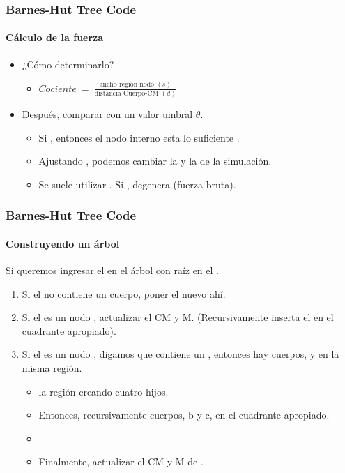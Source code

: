 \frame
{
\frametitle{Barnes-Hut Tree Code}
\framesubtitle{Cálculo de la fuerza}

\begin{itemize}
	\item ¿Cómo determinarlo?
	\begin{itemize}
		\item $ Cociente\ =\ \frac{\text{ancho región nodo }(s)}{\text{distancia Cuerpo-CM }(d)}$
	\end{itemize}
	\item Después, comparar con un valor umbral $\theta$.
	\begin{itemize}
		\item Si , entonces el nodo interno esta lo suficiente .
		\item Ajustando \blue{$\theta$}, podemos cambiar la  y la  de la simulación.
		\item Se suele utilizar . Si , degenera (fuerza bruta).
	\end{itemize}
\end{itemize}
}

\frame
{
\frametitle{Barnes-Hut Tree Code}
\framesubtitle{Construyendo un árbol}

Si queremos ingresar el  en el árbol con raíz en el .

\begin{enumerate}
	\item<1-> Si el  no contiene un cuerpo, poner el nuevo  ahí.
	\item<2-> Si el  es un nodo , actualizar el CM
		y M. (Recursivamente inserta el  en el cuadrante apropiado).
	\item<3-> Si el  es un nodo , digamos que contiene un , entonces hay  cuerpos,  y  en la misma región.
		\begin{itemize}
			\item<4->  la región creando cuatro hijos.
			\item<5-> Entonces, recursivamente  cuerpos, b y c, en el cuadrante apropiado.
			\item<6-> 
			\item<7-> Finalmente, actualizar el CM y M de .
		\end{itemize}
\end{enumerate}
}

